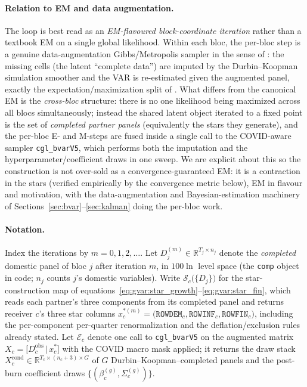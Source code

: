 \documentclass[11pt]{article}
\newcommand{\R}{\mathbb{R}}
\theoremstyle{definition}
\theoremstyle{remark}
\begin{document}
\paragraph{Relation to EM and data augmentation.} The loop is best read as an
\emph{EM-flavoured block-coordinate iteration} rather than a textbook EM on a
single global likelihood. Within each bloc, the per-bloc step is a genuine
data-augmentation Gibbs/Metropolis sampler in the sense of
\citet{TannerWong1987}: the missing cells (the latent ``complete data'') are
imputed by the Durbin--Koopman simulation smoother
\citep{DurbinKoopman2002,DurbinKoopman2012} and the VAR is re-estimated given the
augmented panel, exactly the expectation/maximization split of
\citet{DempsterLairdRubin1977}. What differs from the canonical EM is the
\emph{cross-bloc} structure: there is no one likelihood being maximized across
all blocs simultaneously; instead the shared latent object iterated to a fixed
point is the set of \emph{completed partner panels} (equivalently the stars they
generate), and the per-bloc E- and M-steps are fused inside a single call to the
COVID-aware sampler \texttt{cgl\_bvarV5}, which performs both the imputation and
the hyperparameter/coefficient draws in one sweep. We are explicit about this so
the construction is not over-sold as a convergence-guaranteed EM: it is a
contraction in the stars (verified empirically by the convergence metric below),
EM in flavour and motivation, with the data-augmentation and Bayesian-estimation
machinery of Sections~\ref{sec:bvar}--\ref{sec:kalman} doing the per-bloc work.

\paragraph{Notation.} Index the iterations by $m=0,1,2,\dots$. Let
$D^{(m)}_{j}\in\R^{T_j\times n_j}$ denote the \emph{completed} domestic panel of
bloc $j$ after iteration $m$, in $100\ln$ level space (the \texttt{comp} object
in code; $n_j$ counts $j$'s domestic variables). Write $\mathcal{S}_c\bigl(\{D_j\}\bigr)$
for the star-construction map of
equations~\eqref{eq:gvar:star_growth}--\eqref{eq:gvar:star_fin}, which reads each
partner's three components from its completed panel and returns receiver $c$'s
three star columns
$x^{*(m)}_{c}=\bigl(\texttt{ROWDEM}_c,\texttt{ROWINF}_c,\texttt{ROWFIN}_c\bigr)$,
including the per-component per-quarter renormalization and the
deflation/exclusion rules already stated. Let $\mathcal{E}_c$ denote one call to
\texttt{cgl\_bvarV5} on the augmented matrix
$X_c=\bigl[D_c^{\text{obs}}\,\big|\,x^{*}_c\bigr]$ with the COVID macro mask
applied; it returns the draw stack $X^{\text{cond}}_c\in\R^{T_c\times(n_c+3)\times G}$
of $G$ Durbin--Koopman--completed panels and the post-burn coefficient draws
$\{(\beta_c^{(g)},\Sigma_c^{(g)})\}$.
\end{document}
